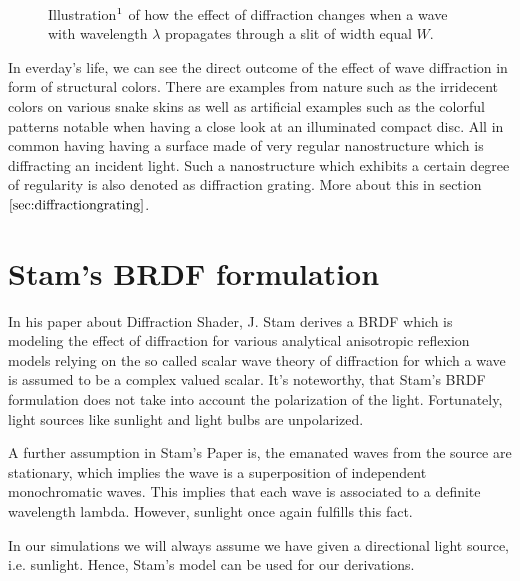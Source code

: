\begin{figure}[H]
  \centering
~
~
  \caption[diffractiondiemsnion]{Illustration$\footnotemark$ of how the effect of diffraction changes when a wave with wavelength $\lambda$ propagates through a slit of width equal $W$.}
  \label{fig:diffractionrelationshipdimension}
\end{figure}

In everday's life, we can see the direct outcome of the effect of wave diffraction in form of structural colors. There are examples from nature such as the irridecent colors on various snake skins as well as artificial examples such as the colorful patterns notable when having a close look at an illuminated compact disc. All in common having having a surface made of very regular nanostructure which is diffracting an incident light. Such a nanostructure which exhibits a certain degree of regularity is also denoted as diffraction grating. More about this in section $\ref{sec:diffractiongrating}$.

\section{Stam's BRDF formulation}
\label{sec:sumstam}
In his paper about Diffraction Shader, J. Stam derives a BRDF which is modeling the effect of diffraction for various analytical anisotropic reflexion models relying on the so called scalar wave theory of diffraction for which a wave is assumed to be a complex valued scalar. 
It's noteworthy, that Stam's BRDF formulation does not take into account the polarization of the light. Fortunately, light sources like sunlight and light bulbs are unpolarized. 

A further assumption in Stam's Paper is, the emanated waves from the source are stationary, which implies the wave is a superposition of independent monochromatic waves. This implies that each wave is associated to a definite wavelength lambda. However, sunlight once again fulfills this fact.

In our simulations we will always assume we have given a directional light source, i.e. sunlight. Hence, Stam's model can be used for our derivations.

